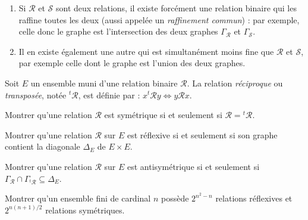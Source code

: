 \begin{remarque}
\begin{enumerate}
\item Si $\mathcal R$ et $\mathcal S$ sont deux relations, il existe forcément une relation binaire qui les raffine toutes les deux (aussi appelée un \emph{raffinement commun}) : par exemple, celle donc le graphe est l'intersection des deux graphes $\Gamma_\mathcal R$ et $\Gamma_\mathcal S$.
\item Il en existe également une autre qui est simultanément moins fine que $\mathcal R$ et $\mathcal S$, par exemple celle dont le graphe est l'union des deux graphes.
\end{enumerate}
\end{remarque}



\begin{definition}
Soit $E$ un ensemble muni d'une relation binaire $\mathcal R$. La relation \emph{réciproque} ou \emph{transposée}, notée ${}^t\mathcal R$, est définie par : $x{}^t\mathcal R y \iff y\mathcal R x$. 
\end{definition}


\begin{exercice}
Montrer qu'une relation $\mathcal R$ est symétrique si et seulement si $\mathcal R = {}^t\mathcal R$.
\end{exercice}

\begin{exercice}
Montrer qu'une relation $\mathcal R$ sur $E$ est réflexive si et seulement si son graphe contient la diagonale $\Delta_E$ de $E\times E$.
\end{exercice}

\begin{exercice}
Montrer qu'une relation $\mathcal R$ sur $E$ est antisymétrique si et seulement si $\Gamma_\mathcal R \cap \Gamma_{{}^t\mathcal R} \subseteq \Delta_E$.
\end{exercice}

\begin{exercice}
Montrer qu'un ensemble fini de cardinal $n$ possède $2^{n^2-n}$ relations réflexives et $2^{n(n+1)/2}$ relations symétriques.
\end{exercice}

